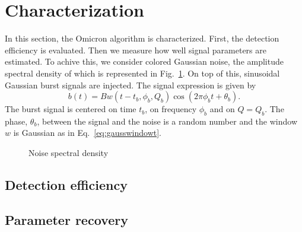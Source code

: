\section{Characterization} \label{sec:characterization}

In this section, the Omicron algorithm is characterized. First, the detection efficiency is evaluated. Then we measure how well signal parameters are estimated. To achive this, we consider colored Gaussian noise, the amplitude spectral density of which is represented in Fig.~\ref{fig:noise_asd}. On top of this, sinusoidal Gaussian burst signals are injected. The signal expression is given by 
\begin{equation}
  b(t) = Bw(t-t_b, \phi_b, Q_b)\cos(2\pi\phi_b t + \theta_b).
\end{equation}
The burst signal is centered on time $t_b$, on frequency $\phi_b$ and on $Q=Q_b$. The phase, $\theta_b$, between the signal and the noise is a random number and the window $w$ is Gaussian as in Eq.~\ref{eq:gausswindowt}.

\begin{figure}
  \center
  \caption{Noise spectral density}
  \label{fig:noise_asd}
\end{figure}

\subsection{Detection efficiency} \label{sec:characterization:efficiency}

\subsection{Parameter recovery} \label{sec:characterization:parameter}

